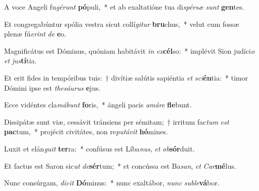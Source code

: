 \item A voce Angeli fu\textit{gé}\textit{runt} \textbf{pó}puli,~* et ab exaltatióne tua di\textit{spér}\textit{sæ} \textit{sunt} \textbf{gen}tes.
\item Et congregabúntur spólia vestra sicut collí\textit{gi}\textit{tur} \textbf{bru}chus,~* velut cum fossæ plenæ fú\textit{e}\textit{rint} \textit{de} \textbf{e}o.
\item Magnificátus est Dóminus, quóniam habitávit \textit{in} \textit{ex}\textbf{cél}so:~* implévit Sion judíci\textit{o} \textit{et} \textit{jus}\textbf{tí}tia.
\item Et erit fides in tempóribus tuis:~† divítiæ salútis sapiéntia \textit{et} \textit{sci}\textbf{én}tia:~* timor Dómini ipse est \textit{the}\textit{sáu}\textit{rus} \textbf{e}jus.
\item Ecce vidéntes cla\textit{má}\textit{bunt} \textbf{fo}ris,~* ángeli pacis \textit{a}\textit{má}\textit{re} \textbf{fle}bunt.
\item Dissipátæ sunt viæ, cessávit tránsiens per sémitam;~† irritum fac\textit{tum} \textit{est} \textbf{pac}tum,~* projécit civitátes, non re\textit{pu}\textit{tá}\textit{vit} \textbf{hó}mines.
\item Luxit et elán\textit{gu}\textit{it} \textbf{ter}ra:~* confúsus est Líba\textit{nus}, \textit{et} \textit{ob}\textbf{sór}duit.
\item Et factus est Saron sic\textit{ut} \textit{de}\textbf{sér}tum;~* et concússa est Ba\textit{san}, \textit{et} \textit{Car}\textbf{mé}lus.
\item Nunc consúrgam, \textit{di}\textit{cit} \textbf{Dó}minus:~* nunc exaltábor, \textit{nunc} \textit{sub}\textit{le}\textbf{vá}bor.
